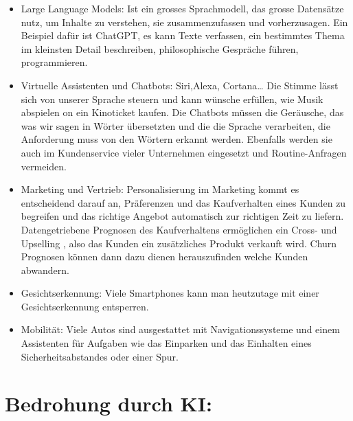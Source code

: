 \documentclass{report}
\begin{document}
\begin{itemize}
    \item Large Language Models: Ist ein grosses Sprachmodell, das grosse Datensätze nutz, um Inhalte zu verstehen, sie zusammenzufassen und vorherzusagen. Ein Beispiel dafür ist ChatGPT, es kann Texte verfassen, ein bestimmtes Thema im kleinsten Detail beschreiben, philosophische Gespräche führen, programmieren.
    \item Virtuelle Assistenten und Chatbots: Siri,Alexa, Cortana… Die Stimme lässt sich von unserer Sprache steuern und kann wünsche erfüllen, wie Musik abspielen on ein Kinoticket kaufen. Die Chatbots müssen die Geräusche, das was wir sagen in Wörter übersetzten und die die Sprache verarbeiten, die Anforderung muss von den Wörtern erkannt werden. Ebenfalls werden sie auch im Kundenservice vieler Unternehmen eingesetzt und Routine-Anfragen vermeiden.
    \item Marketing und Vertrieb: Personalisierung im Marketing kommt es entscheidend darauf an, Präferenzen und das Kaufverhalten eines Kunden zu begreifen und das richtige Angebot automatisch zur richtigen Zeit zu liefern. Datengetriebene Prognosen des Kaufverhaltens ermöglichen ein Cross- und Upselling , also das  Kunden ein zusätzliches Produkt verkauft wird. Churn Prognosen können dann dazu dienen herauszufinden welche Kunden abwandern.
    \item Gesichtserkennung: Viele Smartphones kann man heutzutage mit einer Gesichtserkennung entsperren.
    \item Mobilität: Viele Autos sind ausgestattet mit Navigationssysteme und einem Assistenten für Aufgaben wie das Einparken und das Einhalten eines Sicherheitsabstandes oder einer Spur.
    
\end{itemize}

\section {Bedrohung durch KI:}
\end{document}
